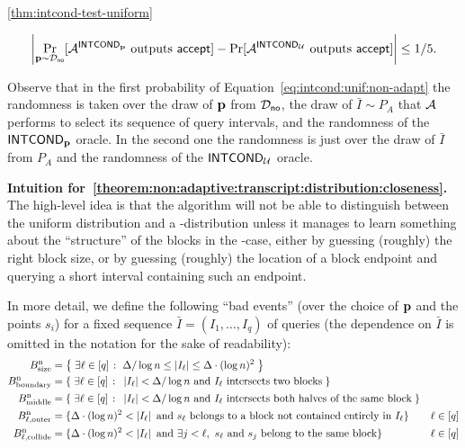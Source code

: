 \begin{proofof}{\cref{thm:intcond-test-uniform}}
\begin{theorem} \label{theorem:non:adaptive:transcript:distribution:closeness}
\begin{equation} \label{eq:intcond:unif:non-adapt}
\left|
\Pr_{\mathbf{p} \sim \mathcal{D}_{\textsf{no}}}[\mathcal{A}^{{\sf INTCOND}_{\mathbf{p}}} \text{~outputs~} \textsf{accept}] - \Pr[\mathcal{A}^{{\sf INTCOND}_{\mathcal{U}}} \text{~outputs~} \textsf{accept}] \right| \leq 1/5.
\end{equation}
\end{theorem}
Observe that in the first probability of Equation~\eqref{eq:intcond:unif:non-adapt}
the randomness is taken over the draw of $\mathbf{p}$ from $\mathcal{D}_{\textsf{no}}$,
the draw of $\bar{I} \sim P_A$ that $\mathcal{A}$ performs to select its sequence
of query intervals, and the randomness of the ${\sf INTCOND}_{\mathbf{p}}$ oracle.
In the second one the randomness is just over the draw of $\bar{I}$ from
$P_A$ and the randomness of the ${\sf INTCOND}_{\mathcal{U}}$ oracle.

\medskip

\noindent
\textbf{Intuition for~\cref{theorem:non:adaptive:transcript:distribution:closeness}.}
The high-level idea is that the algorithm will
not be able to distinguish between the uniform distribution
and a \no-distribution unless it manages to learn something about the
``structure'' of the blocks in the \no-case, either by guessing
(roughly) the right block size, or by guessing (roughly) the
location of a block endpoint and querying a short interval containing such
an endpoint.

In more detail,
we define the following ``bad events'' (over the choice of $\mathbf{p}$ and the points $s_i$)
for a fixed sequence $\bar{I}= (I_1,\dots,I_q)$ of queries
(the dependence on $\bar{I}$ is omitted in the notation for
the sake of readability):
    \begin{align*}
    B^{\rm n}_{\rm size} &= \left\{\;  \exists \ell
\in[q]  \;\colon\;  \Delta/\log n \leq \left\lvert I_\ell \right\rvert \leq \Delta \cdot (\log n)^2\; \right\} &\\
    B^{\rm n}_{\rm boundary} &= \left\{\;  \exists \ell \in[q] \;\colon\;  \left\lvert I_\ell \right\rvert
< \Delta/\log n \text{ and } I_\ell \text{ intersects two blocks}\; \right\} &\\
    B^{\rm n}_{\rm middle}  &= \left\{\;  \exists \ell\in[q]  \;\colon\;  \left\lvert I_\ell \right\rvert < \Delta/\log n \text{ and } I_\ell \text{ intersects both halves of the same block}\; \right\} &\\
    B^{\rm n}_{\ell,\rm outer} &= \{ \Delta \cdot
(\log n)^2 < \left\lvert I_\ell \right\rvert \text{
and } s_\ell \text{ belongs to a block not contained entirely in }
 I_\ell \} &\ell\in[q] \\
    B^{\rm n}_{\ell,\rm collide} &= \{ \Delta \cdot (\log n)^2 <
\left\lvert I_\ell \right\rvert \text{ and } \exists j < \ell,\ s_\ell \text{ and } s_j \text{ belong to the same block} \} &\ell\in[q]
    \end{align*}


\end{proofof}
